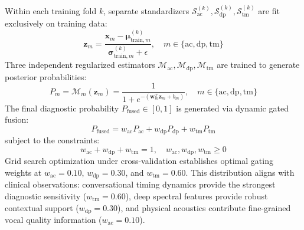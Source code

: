 \documentclass[conference]{IEEEtran}
\begin{document}
Within each training fold $k$, separate standardizers $\mathcal{S}_{\text{ac}}^{(k)}, \mathcal{S}_{\text{dp}}^{(k)}, \mathcal{S}_{\text{tm}}^{(k)}$ are fit exclusively on training data:
\begin{equation}
\mathbf{z}_m = \frac{\mathbf{x}_m - \boldsymbol{\mu}_{\text{train}, m}^{(k)}}{\boldsymbol{\sigma}_{\text{train}, m}^{(k)} + \epsilon}, \quad m \in \{\text{ac}, \text{dp}, \text{tm}\}
\label{eq:standardization}
\end{equation}
Three independent regularized estimators $\mathcal{M}_{\text{ac}}, \mathcal{M}_{\text{dp}}, \mathcal{M}_{\text{tm}}$ are trained to generate posterior probabilities:
\begin{equation}
P_m = \mathcal{M}_m(\mathbf{z}_m) = \frac{1}{1 + e^{-(\mathbf{w}_m^T \mathbf{z}_m + b_m)}}, \quad m \in \{\text{ac}, \text{dp}, \text{tm}\}
\label{eq:posteriors}
\end{equation}
The final diagnostic probability $P_{\text{fused}} \in [0, 1]$ is generated via dynamic gated fusion:
\begin{equation}
P_{\text{fused}} = w_{\text{ac}} P_{\text{ac}} + w_{\text{dp}} P_{\text{dp}} + w_{\text{tm}} P_{\text{tm}}
\label{eq:gated_fusion}
\end{equation}
subject to the constraints:
\begin{equation}
w_{\text{ac}} + w_{\text{dp}} + w_{\text{tm}} = 1, \quad w_{\text{ac}}, w_{\text{dp}}, w_{\text{tm}} \ge 0
\label{eq:constraints}
\end{equation}
Grid search optimization under cross-validation establishes optimal gating weights at $w_{\text{ac}} = 0.10$, $w_{\text{dp}} = 0.30$, and $w_{\text{tm}} = 0.60$. This distribution aligns with clinical observations: conversational timing dynamics provide the strongest diagnostic sensitivity ($w_{\text{tm}} = 0.60$), deep spectral features provide robust contextual support ($w_{\text{dp}} = 0.30$), and physical acoustics contribute fine-grained vocal quality information ($w_{\text{ac}} = 0.10$).
\end{document}
